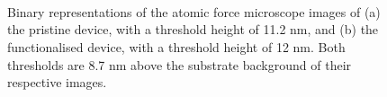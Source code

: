 \documentclass[
  a4paper,
]{scrbook}
\begin{document}
\begin{figure}
\begin{minipage}[t]{0.01\linewidth}
{~

}

\end{minipage}%
%
\begin{minipage}[t]{0.03\linewidth}

{\centering 


}

\end{minipage}%
%
\begin{minipage}[t]{0.01\linewidth}

{\centering 

~

}

\end{minipage}%
%
\begin{minipage}[t]{0.45\linewidth}

{\centering 


}

\end{minipage}%
%
\begin{minipage}[t]{0.01\linewidth}

{\centering 

~

}

\end{minipage}%

\caption{\label{fig-crosssection}Binary representations of the atomic
force microscope images of (a) the pristine device, with a threshold
height of 11.2 nm, and (b) the functionalised device, with a threshold
height of 12 nm. Both thresholds are 8.7 nm above the substrate
background of their respective images.}

\end{figure}
\end{document}
